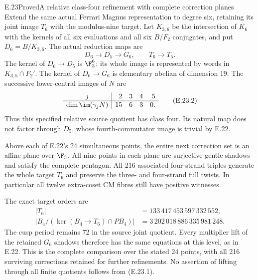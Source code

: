 \begin{statement}{E.23}{Proved}{A relative class-four refinement with complete correction planes}
Extend the same actual Ferrari Magnus representation to
degree six, retaining its joint image $T_6$ with the
modulus-nine target. Let $K_{3,6}$ be the intersection
of $K_6$ with the kernels of all six evaluations and
all six $B/F_2$ conjugates, and put $D_6=B/K_{3,6}$.
The actual reduction maps are
\[
 D_6\longrightarrow D_5\longrightarrow G_6,
 \qquad T_6\longrightarrow T_5.
 \tag{E.23.1}
\]
The kernel of $D_6\to D_5$ is $\F_3^6$;
its whole image is represented by words in
$K_{3,5}\cap F_2'$. The kernel of $D_6\to G_6$
is elementary abelian of dimension 19.
The successive lower-central images of $N$ are
\[
 \begin{array}{c|rrrr}
 j&2&3&4&5\\\hline
 \dim\im(\gamma_jN)&15&6&3&0.
 \end{array}
 \tag{E.23.2}
\]
Thus this specified relative source quotient has
class four. Its natural map does not factor
through $D_5$, whose fourth-commutator image
is trivial by E.22.

Above each of E.22's 24 simultaneous points,
the entire next correction set is an affine
plane over $\F_3$. All nine points in each
plane are surjective gentle shadows and
satisfy the complete pentagon. All 216
associated four-strand triples generate
the whole target $T_6$ and preserve the
three- and four-strand full twists. In
particular all twelve extra-coset CM
fibres still have positive witnesses.

The exact target orders are
\[
 \begin{aligned}
 |T_6|&=133\,417\,453\,597\,332\,552,\\
 |B_4/(\ker(B_4\to T_6)\cap PB_4)|
   &=3\,202\,018\,886\,335\,981\,248.
 \end{aligned}
 \tag{E.23.3}
\]
The cusp period remains 72 in the source
joint quotient. Every multiplier lift
of the retained $G_6$ shadows therefore
has the same equations at this level,
as in E.22. This is the complete
comparison over the stated 24 points,
with all 216 surviving corrections
retained for further refinements.
No assertion of lifting through all
finite quotients follows from (E.23.1).
\end{statement}

